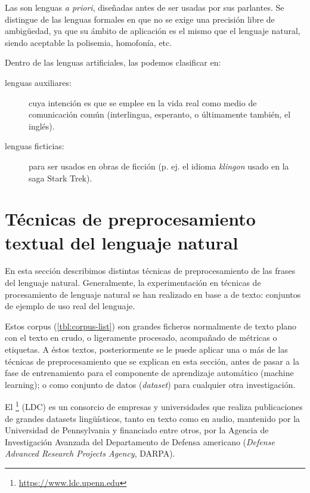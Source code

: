 Las  son lenguas \emph{a priori}, diseñadas antes de ser usadas por sus parlantes. Se distingue de las lenguas formales en que no se exige una precisión libre de ambigüedad, ya que su ámbito de aplicación es el mismo que el lenguaje natural, siendo aceptable la polisemia, homofonía, etc.

Dentro de las lenguas artificiales, las podemos clasificar en:
\nopagebreak
\begin{description}
\item[lenguas auxiliares:] cuya intención es que se emplee en la vida real como medio de comunicación común (interlingua, esperanto, o últimamente también, el inglés).
\item[lenguas ficticias:] para ser usados en obras de ficción (p. ej. el idioma \emph{klingon} usado en la saga Stark Trek).
\end{description}


\section{Técnicas de preprocesamiento textual del lenguaje natural}

En esta sección describimos distintas técnicas de preprocesamiento de las frases del lenguaje natural. Generalmente, la experimentación en técnicas de procesamiento de lenguaje natural se han realizado en base a  de texto: conjuntos de ejemplo de uso real del lenguaje.

Estos corpus (\autoref{tbl:corpus-list}) son grandes ficheros normalmente de texto plano con el texto en crudo, o ligeramente procesado, acompañado de métricas o etiquetas. A éstos textos, posteriormente se le puede aplicar una o más de las técnicas de preprocesamiento que se explican en esta sección, antes de pasar a la fase de entrenamiento para el componente de aprendizaje automático (machine learning); o como conjunto de datos (\emph{dataset}) para cualquier otra investigación.

El \footnote{\url{https://www.ldc.upenn.edu}} (LDC) es un consorcio de empresas y universidades que realiza publicaciones de grandes datasets lingüísticos, tanto en texto como en audio, mantenido por la Universidad de Pennsylvania y financiado entre otros, por la Agencia de Investigación Avanzada del Departamento de Defensa americano (\emph{Defense Advanced Research Projects Agency}, DARPA).


